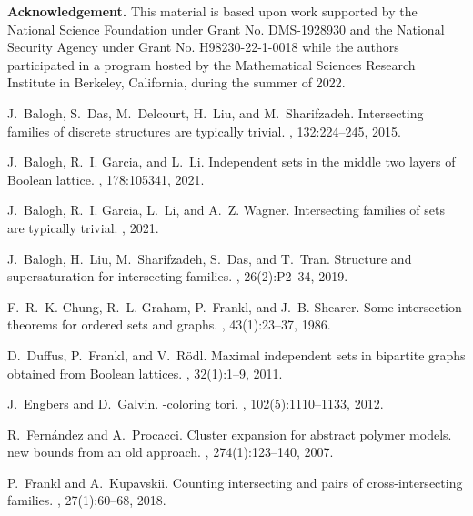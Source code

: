 \documentclass{amsart}
\theoremstyle{definition}
\newcommand{\nin}[0]{\noindent}
\newcommand{\0}[0]{\emptyset}
\begin{document}
\medskip

\nin \textbf{Acknowledgement.} This material is based upon work supported by the National Science Foundation
under Grant No. DMS-1928930 and the National Security Agency under Grant No.
H98230-22-1-0018 while the authors participated in a program hosted by the
Mathematical Sciences Research Institute in Berkeley, California, during the
summer of 2022.

\begin{thebibliography}{10}

J.~Balogh, S.~Das, M.~Delcourt, H.~Liu, and M.~Sharifzadeh.
\newblock Intersecting families of discrete structures are typically trivial.
, 132:224--245, 2015.

J.~Balogh, R.~I. Garcia, and L.~Li.
\newblock Independent sets in the middle two layers of {B}oolean lattice.
, 178:105341, 2021.

J.~Balogh, R.~I. Garcia, L.~Li, and A.~Z. Wagner.
\newblock Intersecting families of sets are typically trivial.
, 2021.

J.~Balogh, H.~Liu, M.~Sharifzadeh, S.~Das, and T.~Tran.
\newblock Structure and supersaturation for intersecting families.
, 26(2):P2--34, 2019.

F.~R.~K. Chung, R.~L. Graham, P.~Frankl, and J.~B. Shearer.
\newblock Some intersection theorems for ordered sets and graphs.
, 43(1):23--37, 1986.

D.~Duffus, P.~Frankl, and V.~R{\"o}dl.
\newblock Maximal independent sets in bipartite graphs obtained from {B}oolean
  lattices.
, 32(1):1--9, 2011.

J.~Engbers and D.~Galvin.
-coloring tori.
, 102(5):1110--1133,
  2012.

R.~Fern{\'a}ndez and A.~Procacci.
\newblock Cluster expansion for abstract polymer models. new bounds from an old
  approach.
, 274(1):123--140, 2007.

P.~Frankl and A.~Kupavskii.
\newblock Counting intersecting and pairs of cross-intersecting families.
, 27(1):60--68, 2018.


\end{thebibliography}
\end{document}
